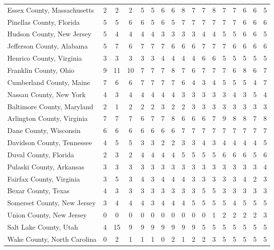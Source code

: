 \begin{landscape}
\begin{longtable}{lcccccccccccccccc}
	Essex County, Massachusetts & 2 & 2 & 2 & 5 & 5 & 6 & 6 & 8 & 7 & 7 & 8 & 7 & 7 & 6 & 6 & 5 \\
	Pinellas County, Florida & 5 & 5 & 6 & 6 & 5 & 6 & 5 & 7 & 7 & 7 & 7 & 7 & 7 & 6 & 6 & 6 \\
	Hudson County, New Jersey & 5 & 4 & 4 & 4 & 4 & 3 & 3 & 3 & 3 & 4 & 4 & 5 & 5 & 6 & 6 & 5 \\
	Jefferson County, Alabama & 5 & 7 & 6 & 7 & 7 & 7 & 6 & 6 & 6 & 7 & 7 & 7 & 6 & 6 & 6 & 6 \\
	Henrico County, Virginia & 3 & 3 & 3 & 3 & 3 & 4 & 4 & 4 & 4 & 6 & 6 & 5 & 5 & 5 & 5 & 5 \\
	Franklin County, Ohio & 9 & 11 & 10 & 7 & 7 & 7 & 8 & 7 & 6 & 7 & 7 & 7 & 6 & 8 & 6 & 7 \\
	Cumberland County, Maine & 7 & 6 & 6 & 7 & 7 & 7 & 7 & 6 & 4 & 3 & 4 & 5 & 5 & 5 & 4 & 7 \\
	Nassau County, New York & 4 & 3 & 4 & 4 & 4 & 4 & 4 & 3 & 3 & 3 & 3 & 3 & 4 & 3 & 5 & 4 \\
	Baltimore County, Maryland & 2 & 1 & 2 & 2 & 2 & 3 & 2 & 2 & 3 & 3 & 3 & 3 & 3 & 3 & 3 & 3 \\
	Arlington County, Virginia & 7 & 7 & 7 & 6 & 7 & 7 & 8 & 6 & 6 & 6 & 7 & 9 & 8 & 8 & 7 & 8 \\
	Dane County, Wisconsin & 6 & 6 & 6 & 6 & 6 & 6 & 6 & 7 & 7 & 7 & 7 & 7 & 7 & 7 & 7 & 7 \\
	Davidson County, Tennessee & 4 & 5 & 5 & 3 & 3 & 2 & 2 & 3 & 3 & 4 & 3 & 4 & 4 & 4 & 4 & 5 \\
	Duval County, Florida & 2 & 3 & 2 & 4 & 4 & 4 & 4 & 5 & 5 & 5 & 5 & 6 & 6 & 6 & 5 & 6 \\
	Pulaski County, Arkansas & 3 & 3 & 3 & 3 & 3 & 3 & 3 & 3 & 3 & 3 & 3 & 3 & 3 & 3 & 3 & 4 \\
	Fairfax County, Virginia & 3 & 5 & 3 & 4 & 3 & 4 & 4 & 4 & 3 & 3 & 3 & 3 & 3 & 4 & 2 & 3 \\
	Bexar County, Texas & 4 & 3 & 3 & 3 & 3 & 3 & 3 & 3 & 3 & 5 & 5 & 3 & 3 & 3 & 3 & 3 \\
	Somerset County, New Jersey & 3 & 4 & 4 & 4 & 3 & 4 & 4 & 4 & 5 & 5 & 5 & 5 & 4 & 5 & 5 & 5 \\
	Union County, New Jersey & 0 & 0 & 0 & 0 & 0 & 0 & 0 & 0 & 0 & 0 & 1 & 2 & 2 & 2 & 2 & 3 \\
	Salt Lake County, Utah & 4 & 15 & 9 & 9 & 9 & 9 & 9 & 9 & 9 & 5 & 5 & 5 & 5 & 5 & 5 & 5 \\
	Wake County, North Carolina & 0 & 2 & 1 & 1 & 1 & 0 & 2 & 1 & 2 & 2 & 3 & 5 & 5 & 5 & 5 & 5 \\

\end{longtable}
\end{landscape}
